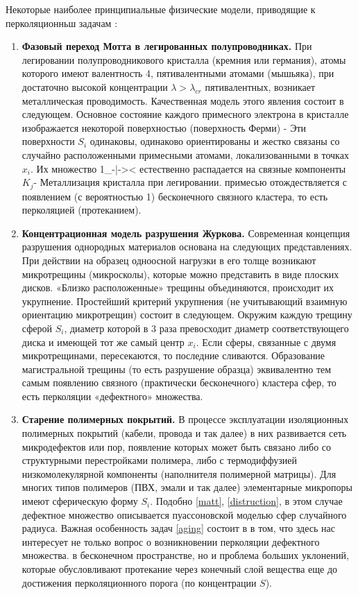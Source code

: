 Некоторые наиболее принципиальные физические модели, приводящие к перколяционньш задачам \cite{menshikov}:

\begin{enumerate}
    \item \label{matt}
    \textbf{Фазовый переход Мотта в легированных полупроводниках.} \newline
        При легировании полупроводникового кристалла (кремния или германия), атомы которого имеют валентность 4, пятивалентными атомами (мышьяка), при достаточно высокой концентрации $\lambda>\lambda_{cr}$ пятивалентных, возникает металлическая проводимость. Качественная модель этого явления состоит в следующем. Основное состояние каждого примесного электрона в кристалле изображается некоторой поверхностью (поверхность Ферми) - Эти поверхности $S_{i}$ одинаковы, одинаково ориентированы и жестко связаны со случайно расположенными примесными атомами, локализованными в точках $x_{i}$. Их множество 1\_-|->< естественно распадается на связные компоненты $K_{j}$- Металлизация кристалла при легировании. примесью отождествляется с появлением (с вероятностью 1) бесконечного связного кластера, то есть перколяцией (протеканием).
    \item \label{distruction}
    \textbf{Концентрационная модель разрушения Журкова.} \newline
        Современная концепция разрушения однородных материалов основана на следующих представлениях. При действии на образец одноосной нагрузки в его толще возникают микротрещины (микросколы), которые можно представить в виде плоских дисков. «Близко расположенные» трещины объединяются, происходит их укрупнение. Простейший критерий укрупнения (не учитывающий взаимную ориентацию микротрещин) состоит в следующем. Окружим каждую трещину сферой $S_{i}$, диаметр которой в $3$ раза превосходит диаметр соответствующего диска и имеющей тот же самый центр $x_{i}$. Если сферы, связанные с двумя микротрещинами, пересекаются, то последние сливаются. Образование магистральной трещины (то есть разрушение образца) эквивалентно тем самым появлению связного (практически бесконечного) кластера сфер, то есть перколяции «дефектного» множества.
    \item \label{aging}
    \textbf{Старение полимерных покрытий.} \newline
        В процессе эксплуатации изоляционных полимерных покрытий (кабели, провода и так далее) в них развивается сеть микродефектов или пор, появление которых может быть связано либо со структурными перестройками полимера, либо с термодиффузией низкомолекулярной компоненты (наполнителя полимерной матрицы). Для многих типов полимеров (ПВХ, эмали и так далее) элементарные микропоры имеют сферическую форму $S_{i}$. Подобно \ref{matt}, \ref{distruction}, в этом случае дефектное множество описывается пуассоновской моделью сфер случайного радиуса. Важная особенность задач \ref{aging} состоит в в том, что здесь нас интересует не только вопрос о возникновении перколяции дефектного множества. в бесконечном пространстве, но и проблема больших уклонений, которые обусловливают протекание через конечный слой вещества еще до достижения перколяционного порога (по концентрации $S$).

\end{enumerate}
